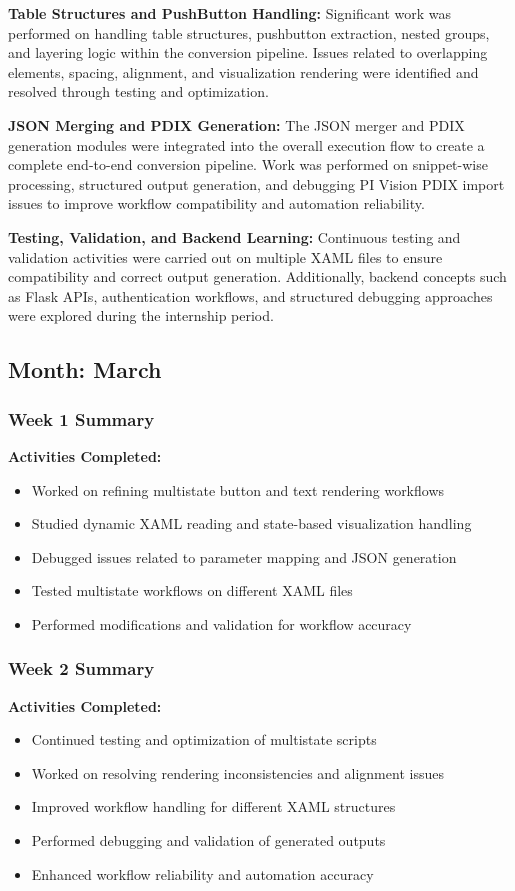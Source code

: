 \documentclass[12pt,a4paper]{report}
\begin{document}
\textbf{Table Structures and PushButton Handling:}
Significant work was performed on handling table structures, pushbutton extraction, nested groups, and layering logic within the conversion pipeline. Issues related to overlapping elements, spacing, alignment, and visualization rendering were identified and resolved through testing and optimization.

\textbf{JSON Merging and PDIX Generation:}
The JSON merger and PDIX generation modules were integrated into the overall execution flow to create a complete end-to-end conversion pipeline. Work was performed on snippet-wise processing, structured output generation, and debugging PI Vision PDIX import issues to improve workflow compatibility and automation reliability.

\textbf{Testing, Validation, and Backend Learning:}
Continuous testing and validation activities were carried out on multiple XAML files to ensure compatibility and correct output generation. Additionally, backend concepts such as Flask APIs, authentication workflows, and structured debugging approaches were explored during the internship period.

\newpage
\subsection*{Month: March}

\subsubsection*{Week 1 Summary}
\textbf{Activities Completed:}
\begin{itemize}[leftmargin=1.5cm]
    \item Worked on refining multistate button and text rendering workflows
    \item Studied dynamic XAML reading and state-based visualization handling
    \item Debugged issues related to parameter mapping and JSON generation
    \item Tested multistate workflows on different XAML files
    \item Performed modifications and validation for workflow accuracy
\end{itemize}

\subsubsection*{Week 2 Summary}
\textbf{Activities Completed:}
\begin{itemize}[leftmargin=1.5cm]
    \item Continued testing and optimization of multistate scripts
    \item Worked on resolving rendering inconsistencies and alignment issues
    \item Improved workflow handling for different XAML structures
    \item Performed debugging and validation of generated outputs
    \item Enhanced workflow reliability and automation accuracy
\end{itemize}
\end{document}
